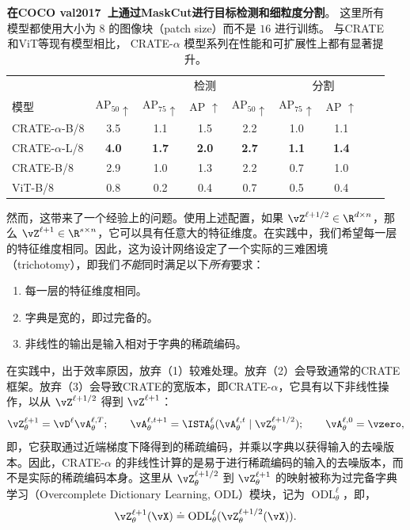 \documentclass[../../book-main_zh.tex]{subfiles}
\begin{document}
\begin{table}[b]
\caption{\small \textbf{在COCO val2017~\citep{lin2014microsoft}上通过MaskCut进行目标检测和细粒度分割}。
这里所有模型都使用大小为 \(8\) 的图像块（patch size）而不是 \(16\) 进行训练。
与CRATE和ViT等现有模型相比，
CRATE-\(\alpha\) 模型系列在性能和可扩展性上都有显著提升。}
\centering
\begin{tabular}{@{}lcccccccc@{}}
\toprule
&  & \multicolumn{3}{c}{检测} &  \multicolumn{3}{c}{分割} \\
模型 & AP$_{50} \uparrow $ & AP$_{75} \uparrow $ & AP $\uparrow$ &
AP$_{50} \uparrow$ & AP$_{75} \uparrow $ & AP $\uparrow$ \\
\midrule
\midrule
CRATE-\(\alpha\)-B/8 & 3.5 & 1.1 & 1.5 & 2.2 & 1.0 & 1.1 \\
CRATE-\(\alpha\)-L/8 & \textbf{4.0} & \textbf{1.7} & \textbf{2.0} &
\textbf{2.7} & \textbf{1.1} & \textbf{1.4} \\
\midrule
\color{gray}CRATE-B/8 & \color{gray}2.9 & \color{gray}1.0 &
\color{gray}1.3 & \color{gray}2.2 & \color{gray}0.7 & \color{gray}1.0 \\
\color{gray}ViT-B/8 & \color{gray}0.8 & \color{gray}0.2 &
\color{gray}0.4 & \color{gray}0.7 & \color{gray}0.5 & \color{gray}0.4 \\
\bottomrule
\end{tabular}
\label{tab:crate_alpha_detection_segmentation}
\end{table}

然而，这带来了一个经验上的问题。使用上述配置，如果 \(\vZ^{\ell + 1/2} \in \R^{d \times n}\)，那么
\(\vZ^{\ell + 1} \in \R^{s \times n}\)，它可以具有任意大的特征维度。在实践中，我们希望每一层的特征维度相同。因此，这为设计网络设定了一个实际的三难困境（trichotomy），即我们\textit{不能}同时满足以下\textit{所有}要求：
\begin{enumerate}
\item 每一层的特征维度相同。
\item 字典是宽的，即过完备的。
\item 非线性的输出是输入相对于字典的稀疏编码。
\end{enumerate}
在实践中，出于效率原因，放弃（1）较难处理。放弃（2）会导致通常的CRATE框架。放弃（3）会导致CRATE的宽版本，即CRATE-\(\alpha\)，它具有以下非线性操作，以从 \(\vZ^{\ell + 1/2}\) 得到 \(\vZ^{\ell + 1}\)：
\begin{equation}
\vZ_{\theta}^{\ell + 1} = \vD^{\ell}\vA_{\theta}^{\ell, T}; \qquad
\vA_{\theta}^{\ell, t + 1} =
\ISTA_{\theta}^{\ell}(\vA_{\theta}^{\ell, t} \mid \vZ_{\theta}^{\ell
+ 1/2}); \qquad \vA_{\theta}^{\ell, 0} = \vzero,
\end{equation}
即，它获取通过近端梯度下降得到的稀疏编码，并乘以字典以获得输入的去噪版本。因此，CRATE-\(\alpha\) 的非线性计算的是易于进行稀疏编码的输入的去噪版本，而不是实际的稀疏编码本身。这里从 \(\vZ_{\theta}^{\ell
+ 1/2}\) 到 \(\vZ_{\theta}^{\ell + 1}\) 的映射被称为过完备字典学习（Overcomplete Dictionary Learning, ODL）模块，记为
\(\operatorname{ODL}_{\theta}^{\ell}\)，即，
\begin{equation}
\vZ_{\theta}^{\ell + 1}(\vX) \doteq
\operatorname{ODL}_{\theta}^{\ell}(\vZ_{\theta}^{\ell + 1/2}(\vX)).
\end{equation}
\end{document}
